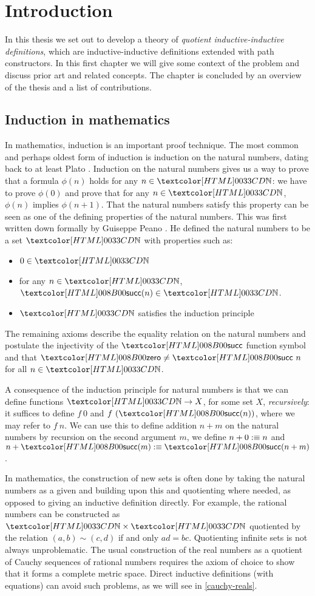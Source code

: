 \chapter{Introduction}
\label{intro}

In this thesis we set out to develop a theory of \emph{quotient
  inductive-inductive definitions}, which are inductive-inductive
definitions \cite{NordvallForsberg2013} extended with path
constructors. In this first chapter we will give some context of the
problem and discuss prior art and related concepts. The chapter is
concluded by an overview of the thesis and a list of contributions.

\section{Induction in mathematics}
In mathematics, induction is an important proof technique. The most
common and perhaps oldest form of induction is induction on the
natural numbers, dating back to at least Plato
\cite{Acerbi2000}. Induction on the natural numbers gives us a way to
prove that a formula $\phi(n)$ holds for any $n \in \natty$: we have
to prove $\phi(0)$ and prove that for any $n \in \natty$, $\phi(n)$
implies $\phi(n+1)$. That the natural numbers satisfy this property
can be seen as one of the defining properties of the natural
numbers. This was first written down formally by Guiseppe Peano
\cite{Peano1889}. He defined the natural numbers to be a set $\natty$
with properties such as:
\begin{itemize}
\item $0 \in \natty$
\item for any $n \in \natty$, $\natsucc(n) \in \natty$.
\item $\natty$ satisfies the induction principle
\end{itemize}
The remaining axioms describe the equality relation on the natural
numbers and postulate the injectivity of the $\natsucc$ function
symbol and that $\natzero \neq \natsucc\ n$ for all $n \in \natty$.

A consequence of the induction principle for natural numbers is that
we can define functions $\natty \to X$, for some set $X$,
\emph{recursively}: it suffices to define $f\ 0$ and
$f\ (\natsucc(n))$, where we may refer to $f\ n$. We can use this to
define addition $n + m$ on the natural numbers by recursion on the
second argument $m$, \ie we define $n + 0 :\equiv n$ and
$n + \natsucc(m) \ddefeq \natsucc(n+m)$.

In mathematics, the construction of new sets is often done by taking
the natural numbers as a given and building upon this and quotienting
where needed, as opposed to giving an inductive definition
directly. For example, the rational numbers can be constructed as
$\natty \times \natty$ quotiented by the relation
$(a , b) \sim (c , d)$ if and only $ad = bc$. Quotienting infinite
sets is not always unproblematic. The usual construction of the real
numbers as a quotient of Cauchy sequences of rational numbers requires
the axiom of choice to show that it forms a complete metric
space. Direct inductive definitions (with equations) can avoid such
problems, as we will see in \cref{cauchy-reals}.

